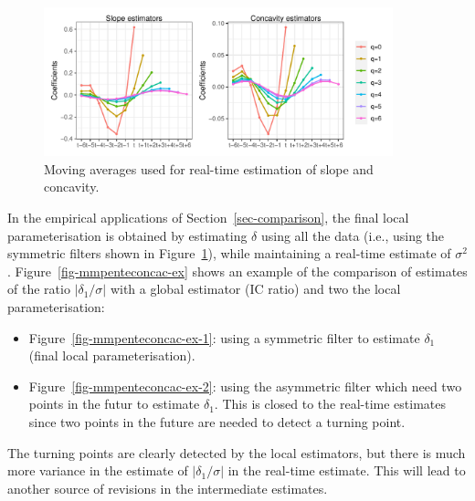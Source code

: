 \documentclass[
]{article}
\newcommand\1{\mathds{1}}
\begin{document}
\begin{figure}[H]

\caption{\label{fig-mmpenteconcac}Moving averages used for real-time
estimation of slope and concavity.}

{\centering \includegraphics[width=0.9\textwidth,height=\textheight]{img/filters_used/mm_penteconcavite.pdf}

}

\end{figure}

In the empirical applications of Section~\ref{sec-comparison}, the final
local parameterisation is obtained by estimating \(\delta\) using all
the data (i.e., using the symmetric filters shown in
Figure~\ref{fig-mmpenteconcac}), while maintaining a real-time estimate
of \(\sigma^2\). Figure~\ref{fig-mmpenteconcac-ex} shows an example of
the comparison of estimates of the ratio \(|\delta_1/\sigma|\) with a
global estimator (IC ratio) and two the local parameterisation:

\begin{itemize}
\item
  Figure~\ref{fig-mmpenteconcac-ex-1}: using a symmetric filter to
  estimate \(\delta_1\) (final local parameterisation).
\item
  Figure~\ref{fig-mmpenteconcac-ex-2}: using the asymmetric filter which
  need two points in the futur to estimate \(\delta_1\). This is closed
  to the real-time estimates since two points in the future are needed
  to detect a turning point.
\end{itemize}

The turning points are clearly detected by the local estimators, but
there is much more variance in the estimate of \(|\delta_1/\sigma|\) in
the real-time estimate. This will lead to another source of revisions in
the intermediate estimates.
\end{document}
